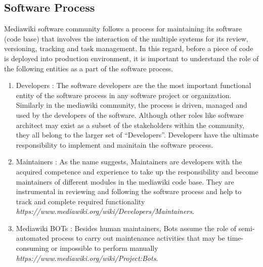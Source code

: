 \subsection{Software Process}
\indent Mediawiki software community follows a process for maintaining its software (code base) that involves the interaction of the multiple systems for its review, versioning, tracking and task management. In this regard, before a piece of code is deployed into production environment, it is important to understand the role of the following entities as a part of the software process. 
\begin{enumerate}
\item Developers : The software developers are the the most important functional entity of the software process in any software project or organization. Similarly in the mediawiki community, the process is driven, managed and used by the developers of the software. Although other roles like software architect may exist as a subset of the stakeholders within the community, they all belong to the larger set of \enquote{Developers}. Developers have the ultimate responsibility to implement and mainitain the software process.
\item Maintainers : As the name suggests, Maintainers are developers with the acquired competence and experience to take up the responsibility and become maintainers of different modules in the mediawiki code base. They are instrumental in reviewing and following the software process and help to track and complete required functionality \emph{https://www.mediawiki.org/wiki/Developers/Maintainers}.
\item Mediawiki BOTs : Besides human maintainers, Bots assume the role of semi-automated process to carry out maintenance activities that may be time-consuming or impossible to perform manually \emph{https://www.mediawiki.org/wiki/Project:Bots}.
\end{enumerate}

